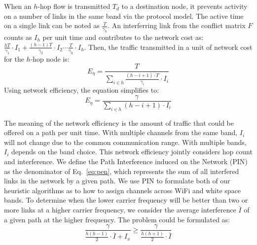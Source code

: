 When an $h$-hop flow is transmitted $T_d$ to a destination node, it prevents 
activity on a number of links in the same band via the protocol model. 
The active time on a single link can be noted as 
$\frac{T}{\gamma_h}$. 
An interferring link from the conflict matrix $F$ counts as $I_h$ per unit time
and contributes to the network cost as:
$\frac{hT}{\gamma_1}\cdot I_1 + \frac{(h-1)T}{\gamma_2}\cdot I_2 \cdots \frac{T}{\gamma_h}\cdot I_h$.
Then, the traffic transmitted in a unit of network cost for the $h$-hop node is:
\begin{equation}
\label{eq:originpen}
E_{\eta}=\frac{T}{\sum_{i \in h}\frac{(h-i+1)\cdot T}{\gamma_i}\cdot I_i }
\end{equation}
Using network efficiency, the equation simplifies to:
\begin{equation}
\label{eq:pen}
E_{\eta}=\frac{\gamma}{\sum_{i \in h} (h-i+1)\cdot I_i}
\end{equation}

The meaning of the network efficiency is the amount of traffic that could be 
offered on a path per unit time. With multiple channels from the same band,
$I_i$ will not change due to the common communication range. With multiple
bands, $I_i$ depends on the band choice.  
This network efficiency jointly considers hop count and interference. We define
the Path Interference induced on the Network (PIN) as the denominator of Eq.~\ref{eq:pen},
which represents the sum of all interfered links in the network by a given path. We
use PIN to formulate both of our heuristic algorithms as to how to assign channels
across WiFi and white space bands.
To determine when the lower carrier frequency will be better than two or more links at a
higher carrier frequency, we consider the average interference $\bar{I}$ of a given path
at the higher frequency.  The problem could be formulated as:
\begin{equation}
\label{eq:benefit}
\frac{\gamma}{\frac{h(h-1)}{2}\cdot \bar{I}+I_x} \geq \frac{\gamma}{\frac{h(h+1)}{2}\cdot \bar{I}}
\end{equation}

